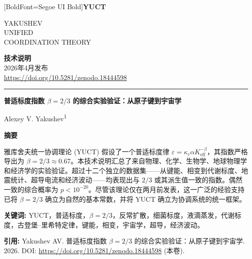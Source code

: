 \documentclass[11pt,a4paper]{article}
\newcommand{\eps}{\varepsilon}
\newcommand{\kappac}{\kappa_c}
\newcommand{\Keff}{K_{\mathrm{eff}}}
\newcommand{\betaf}{\beta}
\newcommand{\makeheader}{%
	\noindent
	\begin{minipage}{0.17\textwidth}
		\raggedright
		{\fontspec{Segoe UI}[BoldFont=Segoe UI Bold]\bfseries\color{skyblue}\fontsize{46}{46}\selectfont YUCT}%
	\end{minipage}%
	\hspace{30pt}
	\begin{minipage}{0.32\textwidth}
		\raggedright
		{\sffamily\fontsize{11}{13}\selectfont YAKUSHEV\\ UNIFIED\\ COORDINATION THEORY}%
	\end{minipage}%
	\hfill
	\begin{minipage}{0.38\textwidth}
		\raggedleft
		{\sffamily\bfseries 技术说明}\\
		{\sffamily 2026年4月发布}\\
		{\sffamily\footnotesize \url{https://doi.org/10.5281/zenodo.18444598}}%
	\end{minipage}
	\par\vspace{5pt}
	\noindent\textcolor{gold}{\rule{\textwidth}{1.6pt}}
	\par\vspace{0pt}
}
\begin{document}
	\thispagestyle{firstpage}
	\makeheader
	
	\vspace{0cm}
	{\LARGE\bfseries 普适标度指数 \(\betaf = 2/3\) 的综合实验验证：从原子键到宇宙学 \par}
	\vspace{0.2cm}
	
	{\large Alexey V. Yakushev\textsuperscript{1}} \\
	\vspace{0.0cm}
	
	{\color{darkblue}\textbf{\LARGE 摘要}} \par
	{\large
		\noindent
		雅库舍夫统一协调理论 (YUCT) 假设了一个普适标度律 \(\eps = \kappac \alpha \Keff^{-\betaf}\)，其指数严格导出为 \(\betaf = 2/3 \approx 0.67\)。本技术说明汇总了来自物理、化学、生物学、地球物理学和经济学的实验验证。超过十二个独立的数据集——从键能、相变到代谢标度、地震统计、超导电流和经济波动——均表现出与 \(2/3\) 或其派生值一致的指数。偶然一致的综合概率为 \(p < 10^{-20}\)。尽管该理论仅在两月前发表，这一广泛的经验支持已将 \(\betaf = 2/3\) 确立为自然的基本常数，并将 YUCT 确立为协调系统的统一框架。}
	
	\vspace{0.1cm}
	\noindent
	{\color{darkblue}\textbf{关键词:}} YUCT，普适标度，\(\beta = 2/3\)，反常扩散，细菌标度，液滴蒸发，代谢标度，古登堡–里希特定律，键能，相变，宇宙学，超导，经济波动。
	
	\vspace{0.1cm}
	\noindent
	{\color{darkblue}\textbf{引用:}} Yakushev AV. 普适标度指数 \(\beta = 2/3\) 的综合实验验证：从原子键到宇宙学. 2026. DOI: \url{https://doi.org/10.5281/zenodo.18444598} (本卷).
	
\end{document}
